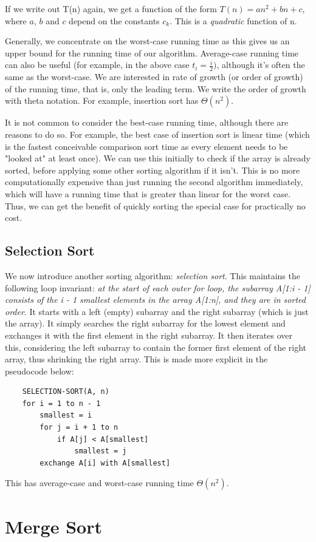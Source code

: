 \documentclass[12pt]{article}
\begin{document}
If we write out T(n) again, we get a function of the form $T(n) = an^2 + bn + c$, where $a$, $b$ and $c$ depend
on the constants $c_k$. This is a \textit{quadratic} function of n.

Generally, we concentrate on the worst-case running time as this gives us an upper bound for the running
time of our algorithm. Average-case running time can also be useful (for example, in the above case $t_i = \frac{i}{2})$,
although it's often the same as the worst-case. We are interested in rate of growth (or order of growth) of the running
time, that is, only the leading term. We write the order of growth with theta notation. For example, insertion
sort has $\Theta(n^2)$.

It is not common to consider the best-case running time, although there are reasons to do so. For example, the
best case of insertion sort is linear time (which is the fastest conceivable comparison sort time as every element needs to
be "looked at" at least once). We can use this initially to check if the array is already sorted, before applying
some other sorting algorithm if it isn't. This is no more computationally expensive than just running the
second algorithm immediately, which will have a running time that is greater than linear for the worst case.
Thus, we can get the benefit of quickly sorting the special case for practically no cost.

\subsection{Selection Sort}
We now introduce another sorting algorithm: \textit{selection sort}. This maintains the following loop
invariant: \textit{at the start of each outer for loop, the subarray A[1:i - 1] consists of the i - 1 smallest
elements in the array A[1:n], and they are in sorted order}. It starts with a left (empty) subarray and
the right subarray (which is just the array). It simply searches the right subarray for the
lowest element and exchanges it with the first element in the right subarray. It then iterates over this, considering
the left subarray to contain the former first element of the right array, thus shrinking the right array. This is made more
explicit in the pseudocode below:
\begin{lstlisting}
    SELECTION-SORT(A, n)
    for i = 1 to n - 1
        smallest = i
        for j = i + 1 to n
            if A[j] < A[smallest]
                smallest = j
        exchange A[i] with A[smallest]
\end{lstlisting}
This has average-case and worst-case running time $\Theta(n^2)$.

\section{Merge Sort}
\end{document}
